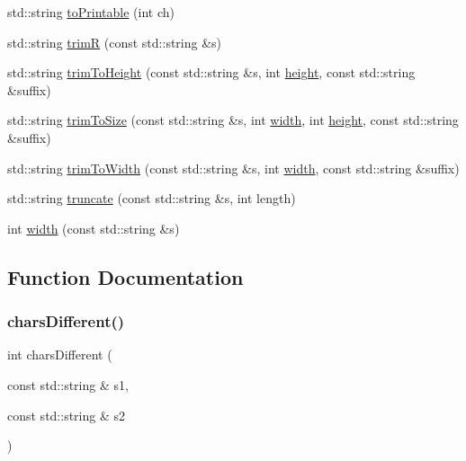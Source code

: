 \begin{DoxyCompactItemize}
std\+::string \mbox{\hyperlink{namespacestringutils_a76282454fe7a94b5e58421de779e002f}{to\+Printable}} (int ch)
\item 
std\+::string \mbox{\hyperlink{namespacestringutils_a3dc91629a4fc8f472be9bd83f6514c25}{trimR}} (const std\+::string \&s)
\item 
std\+::string \mbox{\hyperlink{namespacestringutils_a7b8e78be9a57c43689840a89be870ea7}{trim\+To\+Height}} (const std\+::string \&s, int \mbox{\hyperlink{namespacestringutils_a777c9bd90569d1f9d2dc464a69ea45bd}{height}}, const std\+::string \&suffix)
\item 
std\+::string \mbox{\hyperlink{namespacestringutils_a339e8cc8471386ba4314b587f382150d}{trim\+To\+Size}} (const std\+::string \&s, int \mbox{\hyperlink{namespacestringutils_a24e5e1105ba0113729cd02019020cae9}{width}}, int \mbox{\hyperlink{namespacestringutils_a777c9bd90569d1f9d2dc464a69ea45bd}{height}}, const std\+::string \&suffix)
\item 
std\+::string \mbox{\hyperlink{namespacestringutils_a763bfe1246c3b5e99e57aa95c7f5375e}{trim\+To\+Width}} (const std\+::string \&s, int \mbox{\hyperlink{namespacestringutils_a24e5e1105ba0113729cd02019020cae9}{width}}, const std\+::string \&suffix)
\item 
std\+::string \mbox{\hyperlink{namespacestringutils_a8ad4fa6966778fa36685ad0e5d6fbfe4}{truncate}} (const std\+::string \&s, int length)
\item 
int \mbox{\hyperlink{namespacestringutils_a24e5e1105ba0113729cd02019020cae9}{width}} (const std\+::string \&s)
\end{DoxyCompactItemize}


\subsection{Function Documentation}
\mbox{\label{namespacestringutils_a3c38f7cde8e6340eb0ff2ae3820a2806}} 
\subsubsection{\texorpdfstring{chars\+Different()}{charsDifferent()}}
{\footnotesize\ttfamily int chars\+Different (\begin{DoxyParamCaption}\item[{const std\+::string \&}]{s1,  }\item[{const std\+::string \&}]{s2 }\end{DoxyParamCaption})}

